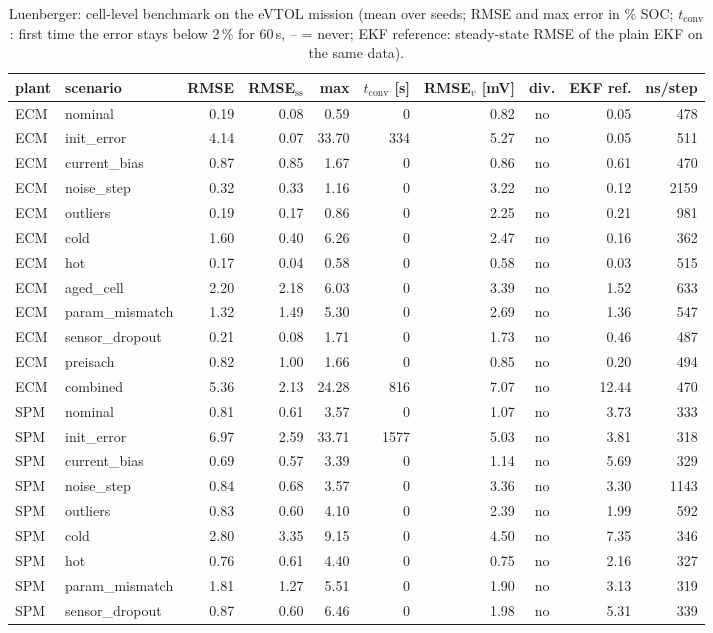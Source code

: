 \begin{table}[H]\centering\footnotesize\setlength{\tabcolsep}{4pt}
\caption{Luenberger: cell-level benchmark on the eVTOL mission (mean over seeds; RMSE and max error in \% SOC; $t_\mathrm{conv}$: first time the error stays below 2\,\% for 60\,s, -- = never; EKF reference: steady-state RMSE of the plain EKF on the same data).}\label{tab:cell_Luenberger}
\begin{tabular}{llrrrrrcrr}\toprule
plant & scenario & RMSE & RMSE$_\mathrm{ss}$ & max & $t_\mathrm{conv}$ [s] & RMSE$_v$ [mV] & div. & EKF ref. & ns/step \\ \midrule
ECM & nominal & 0.19 & 0.08 & 0.59 & 0 & 0.82 & no & 0.05 & 478 \\
ECM & init\_error & 4.14 & 0.07 & 33.70 & 334 & 5.27 & no & 0.05 & 511 \\
ECM & current\_bias & 0.87 & 0.85 & 1.67 & 0 & 0.86 & no & 0.61 & 470 \\
ECM & noise\_step & 0.32 & 0.33 & 1.16 & 0 & 3.22 & no & 0.12 & 2159 \\
ECM & outliers & 0.19 & 0.17 & 0.86 & 0 & 2.25 & no & 0.21 & 981 \\
ECM & cold & 1.60 & 0.40 & 6.26 & 0 & 2.47 & no & 0.16 & 362 \\
ECM & hot & 0.17 & 0.04 & 0.58 & 0 & 0.58 & no & 0.03 & 515 \\
ECM & aged\_cell & 2.20 & 2.18 & 6.03 & 0 & 3.39 & no & 1.52 & 633 \\
ECM & param\_mismatch & 1.32 & 1.49 & 5.30 & 0 & 2.69 & no & 1.36 & 547 \\
ECM & sensor\_dropout & 0.21 & 0.08 & 1.71 & 0 & 1.73 & no & 0.46 & 487 \\
ECM & preisach & 0.82 & 1.00 & 1.66 & 0 & 0.85 & no & 0.20 & 494 \\
ECM & combined & 5.36 & 2.13 & 24.28 & 816 & 7.07 & no & 12.44 & 470 \\
\midrule
SPM & nominal & 0.81 & 0.61 & 3.57 & 0 & 1.07 & no & 3.73 & 333 \\
SPM & init\_error & 6.97 & 2.59 & 33.71 & 1577 & 5.03 & no & 3.81 & 318 \\
SPM & current\_bias & 0.69 & 0.57 & 3.39 & 0 & 1.14 & no & 5.69 & 329 \\
SPM & noise\_step & 0.84 & 0.68 & 3.57 & 0 & 3.36 & no & 3.30 & 1143 \\
SPM & outliers & 0.83 & 0.60 & 4.10 & 0 & 2.39 & no & 1.99 & 592 \\
SPM & cold & 2.80 & 3.35 & 9.15 & 0 & 4.50 & no & 7.35 & 346 \\
SPM & hot & 0.76 & 0.61 & 4.40 & 0 & 0.75 & no & 2.16 & 327 \\
SPM & param\_mismatch & 1.81 & 1.27 & 5.51 & 0 & 1.90 & no & 3.13 & 319 \\
SPM & sensor\_dropout & 0.87 & 0.60 & 6.46 & 0 & 1.98 & no & 5.31 & 339 \\
\bottomrule\end{tabular}\end{table}
